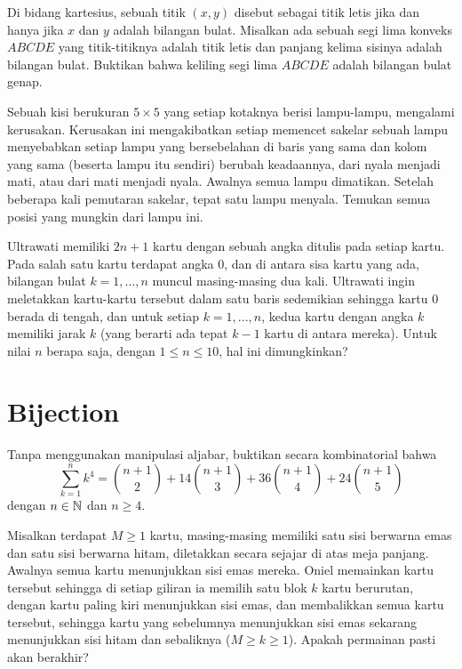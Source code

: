 \documentclass[12pt]{scrartcl}
\begin{document}
\begin{soaljawab}
    Di bidang kartesius, sebuah titik $(x,y)$ disebut sebagai titik letis jika dan
hanya jika $x$ dan $y$ adalah bilangan bulat. Misalkan ada sebuah segi lima konveks $ABCDE$
yang titik-titiknya adalah titik letis dan panjang kelima sisinya adalah bilangan bulat.
Buktikan bahwa keliling segi lima $ABCDE$ adalah bilangan bulat genap.
\end{soaljawab}

\begin{soaljawab}
    Sebuah kisi berukuran $5 \times 5$ yang setiap kotaknya berisi lampu-lampu, mengalami kerusakan. Kerusakan ini mengakibatkan setiap memencet sakelar sebuah lampu menyebabkan setiap lampu yang bersebelahan di baris yang sama dan kolom yang sama (beserta lampu itu sendiri) berubah keadaannya, dari nyala menjadi mati, atau dari mati menjadi nyala. Awalnya semua lampu dimatikan. Setelah beberapa kali pemutaran sakelar, tepat satu lampu menyala. Temukan semua posisi yang mungkin dari lampu ini.
\end{soaljawab}

\begin{soaljawab}
    Ultrawati memiliki $2n + 1$ kartu dengan sebuah angka ditulis pada setiap kartu. Pada salah satu kartu terdapat angka 0, dan di antara sisa kartu yang ada, bilangan bulat $k = 1, \dots, n$ muncul masing-masing dua kali. Ultrawati ingin meletakkan kartu-kartu tersebut dalam satu baris sedemikian sehingga kartu 0 berada di tengah, dan untuk setiap $k = 1, ..., n$, kedua kartu dengan angka $k$ memiliki jarak $k$ (yang berarti ada tepat $k - 1$ kartu di antara mereka). Untuk nilai $n$ berapa saja, dengan $1 \le n \le 10$, hal ini dimungkinkan?
\end{soaljawab}

\section{Bijection}
\begin{soaljawab}
    Tanpa menggunakan manipulasi aljabar, buktikan secara kombinatorial bahwa
    $$\sum_{k=1}^{n} k^4 = {n+1 \choose 2} + 14{n+1 \choose 3}+36{n+1 \choose 4}+24{n+1 \choose 5}$$ dengan $n\in \mathbb N$ dan $n \ge 4$.
\end{soaljawab}

\begin{soaljawab}
Misalkan terdapat $M \ge 1$ kartu, masing-masing memiliki satu sisi berwarna emas dan satu sisi berwarna hitam, diletakkan secara sejajar di atas meja panjang. Awalnya semua kartu menunjukkan sisi emas mereka. Oniel memainkan kartu tersebut sehingga di setiap giliran ia memilih satu blok $k$ kartu berurutan, dengan kartu paling kiri menunjukkan sisi emas, dan membalikkan semua kartu tersebut, sehingga kartu yang sebelumnya menunjukkan sisi emas sekarang menunjukkan sisi hitam dan sebaliknya ($M \ge k \ge 1$). Apakah permainan pasti akan berakhir?
\end{soaljawab}
\end{document}
